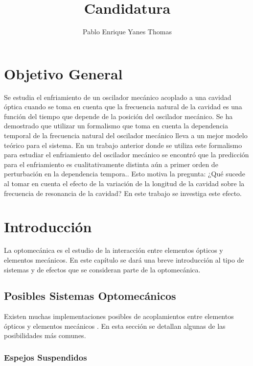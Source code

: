 \documentclass[10pt,a4paper]{report}
\author{Pablo Enrique Yanes Thomas}
\title{Candidatura}
\begin{document}
\tableofcontents
\chapter*{Objetivo General}

Se estudia el enfriamiento de un oscilador mecánico acoplado a una
cavidad óptica cuando se toma en cuenta que la frecuencia natural de
la cavidad es una función del tiempo que depende de la posición del
oscilador mecánico. Se ha demostrado que utilizar un formalismo que
toma en cuenta la dependencia temporal de la frecuencia natural del
oscilador mecánico lleva a un mejor modelo teórico para el
sistema\cite{HanngiFM}. En un trabajo anterior donde se utiliza este
formalismo para estudiar el enfriamiento del oscilador mecánico se
encontró que la predicción para el enfriamiento es cualitativamente
distinta aún a primer orden de perturbación en la dependencia tempora.\cite{YanesOC}. Esto motiva la pregunta: ¿Qué sucede al tomar
en cuenta el efecto de la variación de la longitud de la cavidad sobre
la frecuencia de resonancia de la cavidad? En este trabajo se
investiga este efecto.


\chapter{Introducción}

La optomecánica es el estudio de la interacción entre elementos ópticos y elementos mecánicos. En este capítulo se dará una breve introducción al tipo de sistemas y de efectos que se consideran parte de la optomecánica. 


\section{Posibles Sistemas Optomecánicos}

Existen muchas implementaciones posibles de acoplamientos entre elementos ópticos y elementos mecánicos \cite{KippenberCO}. En esta sección se detallan algunas de las posibilidades más comunes.

\subsection{Espejos Suspendidos}
\end{document}
